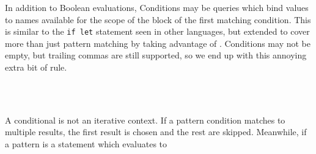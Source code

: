 In addition to Boolean evaluations, Conditions may be queries which bind
values to names available for the scope of the block of the first matching
condition. This is similar to the \texttt{if let} statement seen in other
languages, but extended to cover more than just pattern matching by taking
advantage of \Law{}. Conditions may not be empty, but trailing commas are
still supported, so we end up with this annoying extra bit of rule.

\begin{bnf*}
     \\
     \\
\end{bnf*}

A conditional is not an iterative context. If a pattern condition matches
to multiple results, the first result is chosen and the rest are skipped.
Meanwhile, if a pattern is a statement which evaluates to
